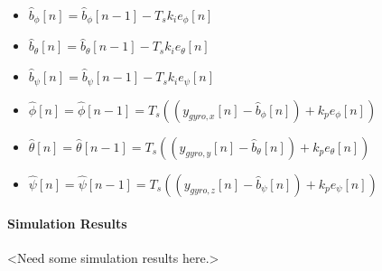 \par{}
\begin{itemize}
\item $\hat{b}_\phi[n] = \hat{b}_\phi[n-1] - T_s k_i e_\phi[n]$
\item $\hat{b}_\theta[n] = \hat{b}_\theta[n-1] - T_s k_i e_\theta[n]$
\item $\hat{b}_\psi[n] = \hat{b}_\psi[n-1] - T_s k_i e_\psi[n]$
\end{itemize}

\par{}
\begin{itemize}
\item $\hat{\phi}[n] = \hat{\phi}[n-1] = T_s \left((y_{gyro,x}[n]-\hat{b}_\phi[n]) + k_p e_\phi[n]\right)$
\item $\hat{\theta}[n] = \hat{\theta}[n-1] = T_s \left((y_{gyro,y}[n]-\hat{b}_\theta[n]) + k_p e_\theta[n]\right)$
\item $\hat{\psi}[n] = \hat{\psi}[n-1] = T_s \left((y_{gyro,z}[n]-\hat{b}_\psi[n]) + k_p e_\psi[n]\right)$
\end{itemize}

\paragraph{Simulation Results}


<Need some simulation results here.>




